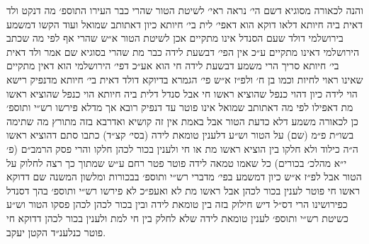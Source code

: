 \documentclass[12pt, openany]{book}
\begin{document}
\begin{multicols}{2}
והנה לכאורה מסוגיא דשם הי׳ נראה ראי׳ לשיטת הטור שהרי כבר העירו התוספ׳ מה דנקט ולד דאית ביה חיותא דלאו דוקא הוא דאפי׳ לית בי׳ חיותא כיון דאתותב שמואל ועוד הקשו דמשמע בירושלמי דולד שעם הסנדל אינו מתקיים אכן לשיטת הטור א״ש שהרי אף לפי מה שכתב הירושלמי דאינו מתקיים ע״כ אין הפי׳ דבשעת לידה כבר מת שהרי בסוגיא שם אמר ולד דאית בי׳ חיותא סריך הרי משמע דבשעת לידה חי הוא אע״כ דפי׳ הירושלמי הוא דאין מתקיים שאינו ראוי לחיות וכמו בן ח׳ ולפ״ז א״ש פי׳ הגמרא בדיוקא דולד דאית בי׳ חיותא מדנפיק רישא הוי לידה כיון דהוי כנפל שהוציא ראשו חי אבל סנדל דלית ביה חיותא הוי כנפל שהוציא ראשו מת דאפילו לפי מה דאתותב שמואל אינו פוטר עד דנפיק רובא אך מדלא פירשו רש״י ותוספ׳ כן לכאורה משמע דלא כדעת הטור אבל באמת אין זה קושיא ואדרבא בזה מתורץ מה שתימה בשו״ת פ״מ (שם) על הטור וש״ע דלענין טומאת לידה (בסי׳ קצ״ד) כתבו סתם דהוציא ראשו ה״ה כילוד ולא חלקו בין הוציא ראשו מת או חי ולענין בכור לכהן חלקו והרי פסק הרמב״ם (פ׳ י״א מהלכ׳ בכורים) כל שאמו טמאה לידה פוטר פטר רחם ע״ש שמתוך כך רצה לחלוק על הטור אבל לפ״ז א״ש כיון דמשמע בפי׳ מדברי רש״י ותוספ׳ בבכורות ומלשון המשנה שם דדוקא ראשו חי פוטר לענין בכור לכהן אבל ראשו מת לא ואעפ״כ לא פירשו רש״י ותוספ׳ בהך דסנדל כפירושינו הרי דס״ל דיש חילוק בזה בין טומאת לידה ובין בכור לכהן לכהן פסקו הטור וש״ע כשיטת רש״י ותוספ׳ לענין טומאת לידה שלא לחלק בין חי למת ולענין בכור לכהן דדוקא חי פוטר כנלענ״ד הקטן יעקב.\\\vspace{0pt}

\end{multicols}\newpage
\end{document}
